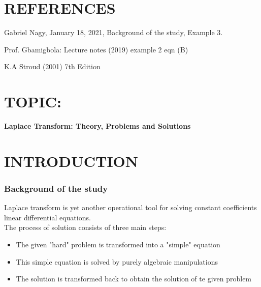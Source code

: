 \documentclass[12pt]{report}
\newcommand{\bt}[1]{\textbf{#1}}
\newcommand{\sps}{\\[0.2cm]}
\begin{document}
	\vspace{2cm}
	\section*{REFERENCES}
	\begin{description}
		\item Gabriel Nagy, January 18, 2021, Background of the study, Example 3.
		
		\item Prof. Gbamigbola: Lecture notes (2019) example 2 eqn (B)
		
		\item K.A Stroud (2001) 7th Edition
	\end{description}
	
	
	
	\newpage
	\section*{TOPIC:}
	{\LARGE \bt{Laplace Transform: Theory, Problems and Solutions}}
	\section*{INTRODUCTION}
	\subsubsection*{Background of the study}
	Laplace transform is yet another operational tool for solving constant coefficients linear differential equations.\sps
	The process of solution consists of three main steps:
	\begin{itemize}
		\item The given "hard" problem is transformed into a "simple" equation
		
		\item This simple equation is solved by purely algebraic manipulations
		
		\item The solution is transformed back to obtain the solution of te given problem
	\end{itemize}
	
\end{document}
